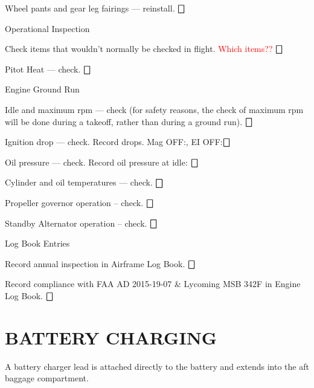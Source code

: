 \begin{enumerate*}
\begin{enumerate*}
		\item Wheel pants and gear leg fairings --- reinstall. \dotfill $\bigbox$
	\end{enumerate*}
	\item{Operational Inspection} 
	\begin{enumerate*}
		\item Check items that wouldn't normally be checked in flight. \textcolor{red}{Which items??} \dotfill $\bigbox$
		\item Pitot Heat --- check. \dotfill $\bigbox$
	\end{enumerate*}
	\item{Engine Ground Run}
	\begin{enumerate*}
		\item Idle and maximum rpm --- check (for safety reasons, the check of maximum rpm will be done during a takeoff, rather than during a ground run). \dotfill $\bigbox$
		\item Ignition drop --- check. Record drops. Mag OFF:\underline{\makebox[0.5in][l]{}}, EI OFF:\underline{\makebox[0.5in][l]{}}\dotfill $\bigbox$
		\item Oil pressure --- check. Record oil pressure at idle: \underline{\makebox[0.5in][l]{}} \dotfill $\bigbox$
		\item Cylinder and oil temperatures --- check. \dotfill $\bigbox$
		\item Propeller governor operation -- check. \dotfill $\bigbox$
		\item Standby Alternator operation -- check. \dotfill $\bigbox$
	\end{enumerate*}
	\item{Log Book Entries}
	\begin{enumerate*}
		\item Record annual inspection in Airframe Log Book. \dotfill $\bigbox$
		\item Record compliance with FAA AD 2015-19-07 \& Lycoming MSB 342F in Engine Log Book. \dotfill $\bigbox$
	\end{enumerate*}
\end{enumerate*}

\section{BATTERY CHARGING}
A battery charger lead is attached directly to the battery and extends into the aft baggage compartment. 

